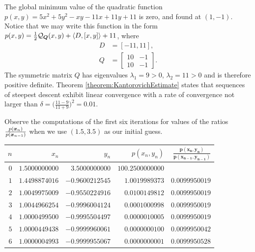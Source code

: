 \begin{example}
The global minimum value of the quadratic function $p(x,y) = 5x^2 + 5y^2 -xy -11x +11y +11$ is zero, and found at $(1,-1)$.  Notice that we may write this function in the form $p(x,y) = \tfrac{1}{2}\mathcal{Q}_{\boldsymbol{Q}}(x,y) + \langle D, [x,y] \rangle + 11$, where
\begin{align*}
D &= [ -11, 11], \\
Q &= \begin{bmatrix} 10 & -1 \\ 10 & -1 \end{bmatrix}.
\end{align*}
The symmetric matrix $Q$ has eigenvalues $\lambda_1 = 9 >0$, $\lambda_2 = 11 > 0$ and is therefore positive definite.  Theorem \ref{theorem:KantorovichEstimate} states that sequences of steepest descent exhibit linear convergence with a rate of convergence not larger than $\delta = \big( \tfrac{11-9}{11+9} \big)^2 = 0.01$.

Observe the computations of the first six iterations for values of the ratios $\frac{p(\boldsymbol{x}_n)}{p(\boldsymbol{x}_{n-1})}$ when we use $(1.5,3.5)$ as our initial guess.
\begin{center}
\begin{tabular}{|r|r|r|r|r|} \hline 
 $n$ & $x_n$ & $y_n$ & $p(x_n,y_n)$ & $\boldsymbol{\frac{p(x_n,y_n)}{p(x_{n-1},y_{n-1})}}$ \\ \hline \hline 
$0$ & $1.5000000000$ & $3.5000000000$ & $100.2500000000$ &  \\ \hline 
$1$ & $1.4498874016$ & $-0.9600212545$ & $1.0019989373$ & $\boldsymbol{0.0099950019}$ \\ \hline 
$2$ & $1.0049975009$ & $-0.9550224916$ & $0.0100149812$ & $\boldsymbol{0.0099950019}$ \\ \hline 
$3$ & $1.0044966254$ & $-0.9996004124$ & $0.0001000998$ & $\boldsymbol{0.0099950019}$ \\ \hline 
$4$ & $1.0000499500$ & $-0.9995504497$ & $0.0000010005$ & $\boldsymbol{0.0099950019}$ \\ \hline 
$5$ & $1.0000449438$ & $-0.9999960061$ & $0.0000000100$ & $\boldsymbol{0.0099950042}$ \\ \hline 
$6$ & $1.0000004993$ & $-0.9999955067$ & $0.0000000001$ & $\boldsymbol{0.0099950528}$ \\ \hline 
\end{tabular}
\end{center}
\end{example}
